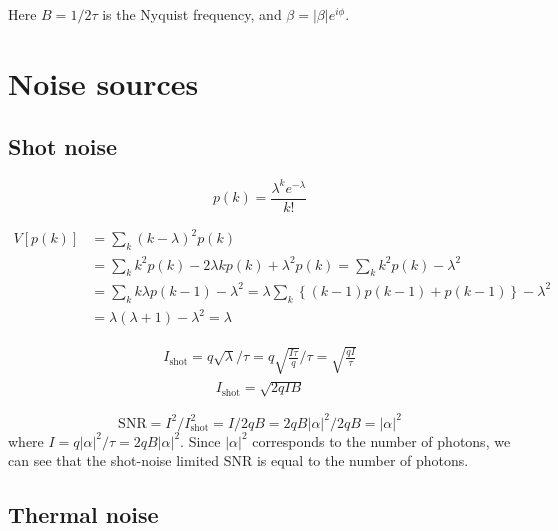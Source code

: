 \documentclass{book}
\begin{document}
Here $B = 1/2\tau$ is the Nyquist frequency, and $\beta = |\beta|e^{i\phi}$.


\section{Noise sources}
\subsection{Shot noise}
\begin{equation}
	p(k) = \frac{\lambda^k e^{-\lambda}}{k!}
\end{equation}

\begin{equation}
\begin{aligned}
	V[p(k)] &= \sum_k{(k-\lambda)^2}p(k)\\
	&= \sum_k{k^2 p(k) - 2\lambda k p(k) + \lambda^2 p(k)} = \sum_k{k^2 p(k) - \lambda^2} \\
	&=\sum_k{k\lambda p(k-1) - \lambda^2} = \lambda\sum_k{\left\{ (k-1)p(k-1) + p(k-1)\right\}}-\lambda^2 \\
	&= \lambda(\lambda + 1) - \lambda^2 = \lambda
\end{aligned}
\end{equation}

\begin{equation}
	\begin{aligned}
		I_{\mathrm{shot}} = q\sqrt{\lambda}/\tau = q\sqrt{\frac{I\tau}{q}}/\tau = \sqrt{\frac{qI}{\tau}}
	\end{aligned}
\end{equation}
\begin{equation}
	\begin{aligned}
		I_\mathrm{shot}=\sqrt{2qIB}
	\end{aligned}
\end{equation}

\begin{equation}
  \mathrm{SNR} = I^2 / I_\mathrm{shot}^2 = I/2qB = 2qB|\alpha |^2/2qB = |\alpha|^2
\end{equation}
where $I=q|\alpha|^2/\tau = 2qB|\alpha|^2$. Since $|\alpha|^2$ corresponds to the number of photons, we can see that the shot-noise limited SNR is equal to the number of photons.


\subsection{Thermal noise}
\end{document}

